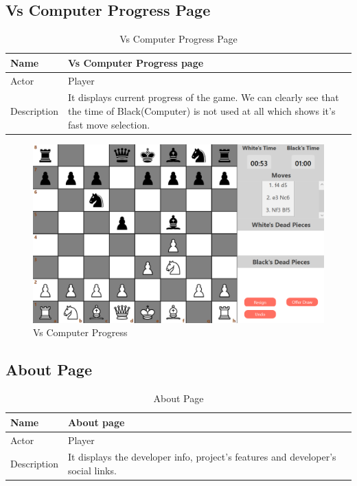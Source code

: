 \documentclass[a4paper,12pt]{article}
\begin{document}
\subsection{Vs Computer Progress Page}

\begin{longtable}{|m{}|m{}|}
    \caption{Vs Computer Progress Page} \\
    \hline
    Name & Vs Computer Progress page \\
    \hline
    Actor & Player \\
    \hline
    Description & It displays current progress of the game. We can clearly see that the time of Black(Computer) is not used at all which shows it's fast move selection. \\ 
    \hline
\end{longtable}

\begin{figure}[H]
    \centering
    \includegraphics[width=0.7\linewidth]{Images/Use Cases/vsComputerProgress.png}
    \caption{Vs Computer Progress}
    \label{fig:vsComputerProgress}
\end{figure}
    
\subsection{About Page}

\begin{longtable}{|m{}|m{}|}
    \caption{About Page} \\
    \hline
    Name & About page \\
    \hline
    Actor & Player \\
    \hline
    Description & It displays the developer info, project's features and developer's social links. \\ 
    \hline
\end{longtable}
\end{document}
